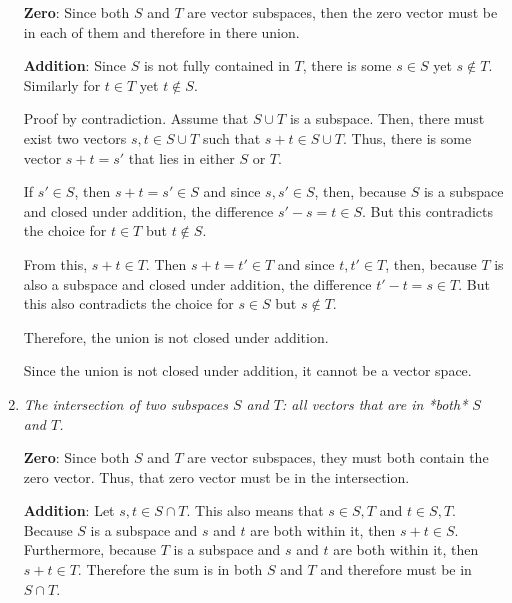 \documentclass{article}
\begin{document}
\begin{enumerate}
    \bigbreak

    {\bf Zero}: Since both $S$ and $T$ are vector subspaces, then the zero vector
    must be in each of them and therefore in there union.

    \bigbreak

    {\bf Addition}: Since $ S $ is not fully contained in $ T $, there is
    some $ s \in S $ yet $ s \notin T $. Similarly for $ t \in T $ yet $ t
    \notin S $.
    
    Proof by contradiction. Assume that $ S \cup T $ is a subspace. Then,
    there must exist two vectors $ s, t \in S \cup T $ such that $ s + t \in
    S \cup T $. Thus, there is some vector $ s + t = s' $ that lies in either
    $ S $ or $ T $.
    
    If $ s' \in S $, then $ s + t = s' \in S $ and since $ s, s' \in S $,
    then, because $ S $ is a subspace and closed under addition, the difference
    $ s' - s = t \in S $. But this contradicts the choice for $ t \in T $ but
    $ t \notin S $.

    From this, $ s + t \in T $. Then $ s + t = t' \in T $ and since $ t, t'
    \in T $, then, because $ T $ is also a subspace and closed under
    addition, the difference $ t' - t = s \in T $. But this also contradicts
    the choice for $ s \in S $ but $ s \notin T $.

    Therefore, the union is not closed under addition.

    \bigbreak

    Since the union is not closed under addition, it cannot be a vector space.

    \item \textit{The intersection of two subspaces $S$ and $T$: all vectors
    that are in *both* $S$ and $T$.}

    \bigbreak

    {\bf Zero}: Since both $ S $ and $ T $ are vector subspaces, they must
    both contain the zero vector. Thus, that zero vector must be in the
    intersection.

    \bigbreak

    {\bf Addition}: Let $ s,t \in S \cap T $. This also means that $ s \in S,
    T $ and $ t \in S, T $. Because $ S $ is a subspace and $ s $ and $ t $
    are both within it, then $ s + t \in S $. Furthermore, because $ T $ is a
    subspace and $ s $ and $ t $ are both within it, then $ s + t \in T $.
    Therefore the sum is in both $ S $ and $ T $ and therefore must be in $ S
    \cap T $.


\end{enumerate}
\end{document}
